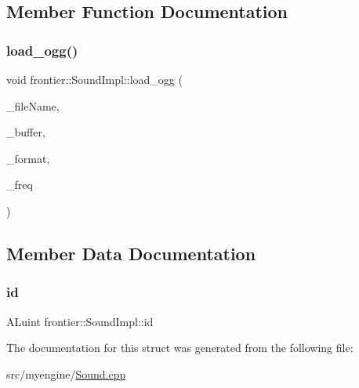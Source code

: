 \subsection{Member Function Documentation}
\mbox{\label{structfrontier_1_1_sound_impl_aa7170ec2e5d847deda459543a38670e0}} 
\subsubsection{\texorpdfstring{load\+\_\+ogg()}{load\_ogg()}}
{\footnotesize\ttfamily void frontier\+::\+Sound\+Impl\+::load\+\_\+ogg (\begin{DoxyParamCaption}\item[{std\+::string}]{\+\_\+file\+Name,  }\item[{std\+::vector$<$ char $>$ \&}]{\+\_\+buffer,  }\item[{A\+Lenum \&}]{\+\_\+format,  }\item[{A\+Lsizei \&}]{\+\_\+freq }\end{DoxyParamCaption})\hspace{0.3cm}{\ttfamily [inline]}}



\subsection{Member Data Documentation}
\mbox{\label{structfrontier_1_1_sound_impl_ae8b2e75a8ca0784b44f0e167d69a1128}} 
\subsubsection{\texorpdfstring{id}{id}}
{\footnotesize\ttfamily A\+Luint frontier\+::\+Sound\+Impl\+::id}



The documentation for this struct was generated from the following file\+:\begin{DoxyCompactItemize}
\item 
src/myengine/\hyperlink{_sound_8cpp}{Sound.\+cpp}\end{DoxyCompactItemize}
